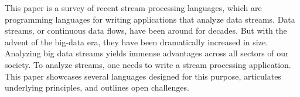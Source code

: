 This paper is a survey of recent stream processing languages, which
are programming languages for writing applications that analyze data
streams. Data streams, or continuous data flows, have been around for
decades. But with the advent of the big-data era, they have been 
dramatically increased in size. Analyzing big data streams yields
immense advantages across all sectors of our society. To analyze
streams, one needs to write a stream processing application. This
paper showcases several languages designed for this purpose,
articulates underlying principles, and outlines open challenges.
